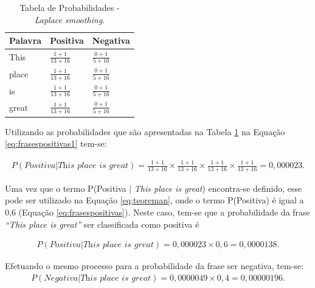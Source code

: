 \begin{table}[htb]
\centering
\renewcommand{\arraystretch}{1.5}%
\begin{tabular}{lll}
\hline

Palavra & Positiva & Negativa \\ \hline
This & \large $\frac{1 + 1}{13 + 16}$ & \large $\frac{0 + 1}{5 + 16}$ \\
place & \large $\frac{1 + 1}{13 + 16}$ & \large $\frac{0 + 1}{5 + 16}$ \\
is & \large $\frac{1 + 1}{13 + 16}$ & \large $\frac{0 + 1}{5 + 16}$ \\
great & \large $\frac{1 + 1}{13 + 16}$ & \large $\frac{0 + 1}{5 + 16}$ \\
\end{tabular}
\caption{Tabela de Probabilidades - \textit{Laplace smoothing}.}
\label{tab:probabilidadesl}
\end{table}

Utilizando as probabilidades que são apresentadas na Tabela
\ref{tab:probabilidadesl} na Equação \ref{eq:frasespositivas1} tem-se:

\begin{equation}
\begin{gathered}
P(Positiva|\textit{This place is great}) = \frac{1 + 1}{13 + 16} \times
\frac{1 + 1}{13 + 16} \times \frac{1 + 1}{13 + 16} \times
\frac{1 + 1}{13 + 16} = 0,000023.
\label{eq:ppositivaplace}
\end{gathered}
\end{equation}

Uma vez que o termo P(Positiva $\vert$ \textit{This place is great})
encontra-se definido, esse pode ser utilizado na Equação \ref{eq:teoreman},
onde o termo P(Positiva) é igual a 0,6 (Equação \ref{eq:frasespositivas}). Neste caso, tem-se que a probabilidade da
frase \textit{``This place is great''} ser classificada como positiva é

\begin{equation}
\begin{gathered}
P(Positiva|\textit{This place is great})
=
0,000023 \times
0,6 = 0,0000138.
\label{eq:positiva}
\end{gathered}
\end{equation}

Efetuando o mesmo processo para a probabilidade da frase ser negativa, tem-se:
\begin{equation}
\begin{gathered}
P(Negativa|\textit{This place is great})
=
0,0000049 \times
0,4 = 0,00000196.
\label{eq:negativa}
\end{gathered}
\end{equation}


